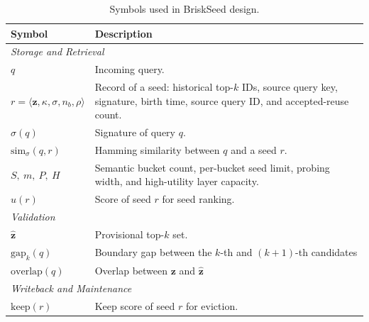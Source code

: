 \begin{table}[t]
	\caption{Symbols used in BriskSeed design.}
	\label{tab:pipeline-symbols}
	\centering
	\setlength{\tabcolsep}{3pt}
	\begin{tabular}{p{2.35cm}p{5.75cm}}
		\toprule
		Symbol & Description \\
		\midrule
		\multicolumn{2}{l}{\textit{Storage and Retrieval}} \\
		$q$ & Incoming query. \\
        $r=\langle \mathbf{z}, \kappa, \sigma, n_b, \rho \rangle$ & Record of a seed: historical top-$k$ IDs, source query key, signature, birth time, source query ID, and accepted-reuse count. \\
        $\sigma(q)$ & Signature of query $q$.\\
        $\mathrm{sim}_{\sigma}(q,r)$ & Hamming similarity between $q$ and a seed $r$.\\
		$S,\ m,\ P,\ H$ & Semantic bucket count, per-bucket seed limit, probing width, and high-utility layer capacity. \\
		$u(r)$ & Score of seed $r$ for seed ranking. \\
		\midrule
		\multicolumn{2}{l}{\textit{Validation}} \\
		$\hat{\mathbf{z}}$ & Provisional top-$k$ set. \\
        $\mathrm{gap}_k(q)$ & Boundary gap between the $k$-th and $(k+1)$-th candidates\\
        $\mathrm{overlap}(q)$ & Overlap between $\mathbf{z}$ and $\hat{\mathbf{z}}$\\ 
        
		\midrule
		\multicolumn{2}{l}{\textit{Writeback and Maintenance}} \\
		$\mathrm{keep}(r)$ & Keep score of seed $r$ for eviction. \\
		\bottomrule
	\end{tabular}
\end{table}

